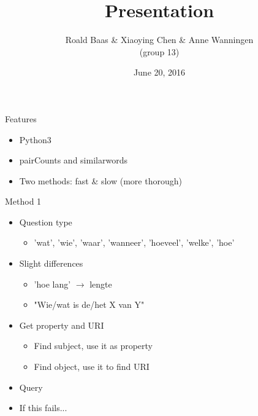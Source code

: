 
\title{Presentation}
\author{Roald Baas \& Xiaoying Chen \& Anne Wanningen\\(group 13)}
\date{June 20, 2016}




  \begin{frame}
    \titlepage
  \end{frame}


  \begin{frame}{Features}
    \begin{itemize}
      \item Python3
      \item pairCounts and similarwords
      \item Two methods: fast \& slow (more thorough)
    \end{itemize}
  \end{frame}
  
  \begin{frame}{Method 1}
    \begin{itemize}
      \item Question type %
      \begin{itemize}
        \item 'wat', 'wie', 'waar', 'wanneer', 'hoeveel', 'welke', 'hoe'
      \end{itemize}
      \item Slight differences
      \begin{itemize}
        \item 'hoe lang' $\rightarrow$ lengte
        \item "Wie/wat is de/het X van Y"
      \end{itemize}
      \item Get property and URI
      \begin{itemize}
        \item Find subject, use it as property
        \item Find object, use it to find URI
      \end{itemize}
      \item Query
      \item If this fails...
    \end{itemize}
  \end{frame}
  
